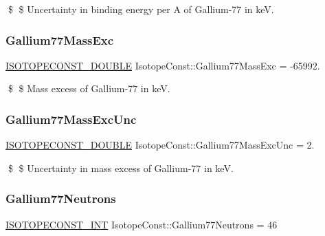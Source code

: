 \$ \$ Uncertainty in binding energy per A of Gallium-\/77 in keV. \mbox{\label{group___isotope_const-_gallium-_ga77_ga943bd321ad7f1b26de570f433af4846b}} 
\subsubsection{\texorpdfstring{Gallium77\+Mass\+Exc}{Gallium77MassExc}}
{\footnotesize\ttfamily \mbox{\hyperlink{group___isotope_const-_macros_ga8f45a7272ce02c0b4c65c44636ed719a}{I\+S\+O\+T\+O\+P\+E\+C\+O\+N\+S\+T\+\_\+\+D\+O\+U\+B\+LE}} Isotope\+Const\+::\+Gallium77\+Mass\+Exc = -\/65992.}

\$ \$ Mass excess of Gallium-\/77 in keV. \mbox{\label{group___isotope_const-_gallium-_ga77_ga063bb6cca32265aefdc1af7db370da41}} 
\subsubsection{\texorpdfstring{Gallium77\+Mass\+Exc\+Unc}{Gallium77MassExcUnc}}
{\footnotesize\ttfamily \mbox{\hyperlink{group___isotope_const-_macros_ga8f45a7272ce02c0b4c65c44636ed719a}{I\+S\+O\+T\+O\+P\+E\+C\+O\+N\+S\+T\+\_\+\+D\+O\+U\+B\+LE}} Isotope\+Const\+::\+Gallium77\+Mass\+Exc\+Unc = 2.}

\$ \$ Uncertainty in mass excess of Gallium-\/77 in keV. \mbox{\label{group___isotope_const-_gallium-_ga77_ga4455ba6189496b84706a89d3f8851079}} 
\subsubsection{\texorpdfstring{Gallium77\+Neutrons}{Gallium77Neutrons}}
{\footnotesize\ttfamily \mbox{\hyperlink{group___isotope_const-_macros_ga5f18360b3e99483a35c32d789e62621c}{I\+S\+O\+T\+O\+P\+E\+C\+O\+N\+S\+T\+\_\+\+I\+NT}} Isotope\+Const\+::\+Gallium77\+Neutrons = 46}

